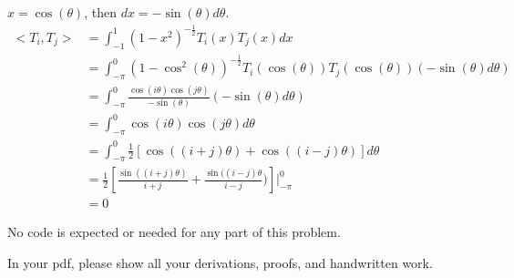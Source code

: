 \documentclass[conference,onecolumn]{IEEEtran}
\begin{document}
\begin{enumerate}[label=\arabic{enumi}.]
\begin{enumerate}
                        $x = \cos(\theta)$, then $dx = -\sin(\theta) d\theta$.
                        \begin{align*}
                              < T_i, T_j > & = \int_{-1}^{1} (1 - x^2)^{-\frac{1}{2}} T_i(x) T_j(x) dx                                                            \\
                                           & = \int_{-\pi}^{0} (1 - \cos^2(\theta))^{-\frac{1}{2}} T_i(\cos(\theta)) T_j(\cos(\theta)) (- \sin(\theta)d\theta)    \\
                                           & = \int_{-\pi}^{0} \frac{\cos(i\theta) \cos(j\theta)}{- \sin(\theta)} (- \sin(\theta)d\theta)                         \\
                                           & = \int_{-\pi}^{0} \cos(i\theta) \cos(j\theta) d\theta                                                                \\
                                           & = \int_{-\pi}^{0} \frac{1}{2} \left[ \cos((i + j)\theta) + \cos((i - j)\theta) \right] d\theta                       \\
                                           & = \frac{1}{2} \left[ \frac{\sin((i + j)\theta)}{i + j} + \frac{\sin((i - j)\theta}{i - j}) \right] \rvert_{-\pi}^{0} \\
                                           & = 0
                        \end{align*}
            \end{enumerate}
            No code is expected or needed for any part of this problem.

            In your pdf, please show all your derivations, proofs, and handwritten work.


\end{enumerate}
\end{document}
